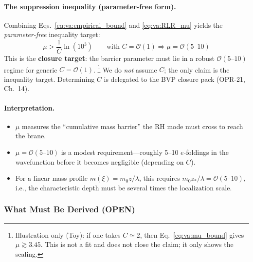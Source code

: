 \paragraph{The suppression inequality (parameter-free form).}
Combining Eqs.~\eqref{eq:va:empirical_bound} and \eqref{eq:va:RLR_mu} yields
the \emph{parameter-free} inequality target:
\begin{equation}
    \boxed{
    \mu > \frac{1}{C}\ln(10^3)
    \qquad
    \text{with } C = \mathcal{O}(1) \Rightarrow \mu = \mathcal{O}(5\text{--}10)
    }
    \label{eq:va:mu_bound}
\end{equation}
This is the \textbf{closure target}: the barrier parameter must lie in a robust
$\mathcal{O}(5\text{--}10)$ regime for generic $C = \mathcal{O}(1)$.%
\footnote{Illustration only (Toy): if one takes $C \simeq 2$, then
Eq.~\eqref{eq:va:mu_bound} gives $\mu \gtrsim 3.45$. This is not a fit and does
not close the claim; it only shows the scaling.}
We do \emph{not} assume $C$; the only claim is the inequality target.
Determining $C$ is delegated to the BVP closure pack (OPR-21, Ch.~14).

\paragraph{Interpretation.}
\begin{itemize}[nosep]
    \item $\mu$ measures the ``cumulative mass barrier'' the RH mode must cross
          to reach the brane.
    \item $\mu = \mathcal{O}(5\text{--}10)$ is a modest requirement---roughly
          5--10 $e$-foldings in the wavefunction before it becomes negligible
          (depending on $C$).
    \item For a linear mass profile $m(\xi) = m_0 z/\lambda$, this requires
          $m_0 z_*/\lambda = \mathcal{O}(5\text{--}10)$, i.e., the characteristic
          depth must be several times the localization scale.
\end{itemize}

\subsubsection{What Must Be Derived (OPEN)}

